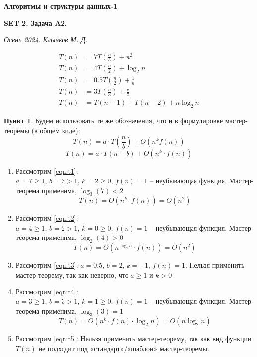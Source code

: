 \documentclass[11pt,a4paper]{scrarticle}
\author{Клычков Максим Дмитриевич}
\theoremstyle{definition}
\newtheorem{subtask}{Пункт}
\begin{document}
\centerline{\textbf{\huge Алгоритмы и структуры данных-1}}
\centerline{\textbf{SET 2. Задача A2.}}
\begin{flushright}
	\emph{Осень 2024. Клычков М. Д.}
\end{flushright}

\begin{align}
	\label{eqn:t1} T(n) & = 7 T\left(\frac{n}{3}\right) + n^2                      \\
	\label{eqn:t2} T(n) & = 4 T\left(\frac{n}{2}\right) + \log_2 n                 \\
	\label{eqn:t3} T(n) & = 0.5 T\left(\frac{n}{2}\right) + \frac{1}{n}            \\
	\label{eqn:t4} T(n) & = 3 T\left(\frac{n}{3}\right) + \frac{n}{2}              \\
	\label{eqn:t5} T(n) & = T\left(n - 1\right) + T\left(n - 2\right) + n \log_2 n
\end{align}

\begin{subtask}
	Будем использовать те же обозначения, что и в формулировке мастер-теоремы (в общем виде):
	$$
		T(n) = a \cdot T\left(\frac{n}{b}\right) + O(n^k f(n))
	$$
	$$
		T(n) = a \cdot T(n - b) + O(n^k \cdot f(n))
	$$

	\begin{enumerate}
		\item Рассмотрим \eqref{eqn:t1}:
		      $a = 7 \geq 1, \, b = 3 > 1, \, k = 2 \geq 0, \, f(n) = 1 \text{ -- неубывающая функция}$. Мастер-теорема применима, $\log_3(7) < 2$
		      $$
			      T(n) = O(n^k \cdot f(n)) = O(n^2)
		      $$
		\item Рассмотрим \eqref{eqn:t2}:
		      $a = 4 \geq 1, \, b = 2 > 1, \, k = 0 \geq 0, \, f(n) = 1 \text{ -- неубывающая функция}$. Мастер-теорема применима, $\log_2(4) > 0$
		      $$
			      T(n) = O(n^{\log_b a} \cdot f(n)) = O(n^2)
		      $$
		\item Рассмотрим \eqref{eqn:t3}:
		      $a = 0.5, \, b = 2, \, k = -1, \, f(n) = 1$. Нельзя применить мастер-теорему, так как неверно, что $a \geq 1$ и $k > 0$
		\item Рассмотрим \eqref{eqn:t4}:
		      $a = 3 \geq 1, \, b = 3 > 1, \, k = 1 \geq 0, \, f(n) = 1 \text{ -- неубывающая функция}$. Мастер-теорема применима, $\log_3(3) = 1$
		      $$
			      T(n) = O(n^k \cdot f(n) \cdot \log_2 n) = O(n \log_2 n)
		      $$
		\item Рассмотрим \eqref{eqn:t5}:
		      Нельзя применить мастер-теорему, так как вид функции $T(n)$ не подходит под «стандарт»/«шаблон» мастер-теоремы.
	\end{enumerate}
\end{subtask}
\end{document}

